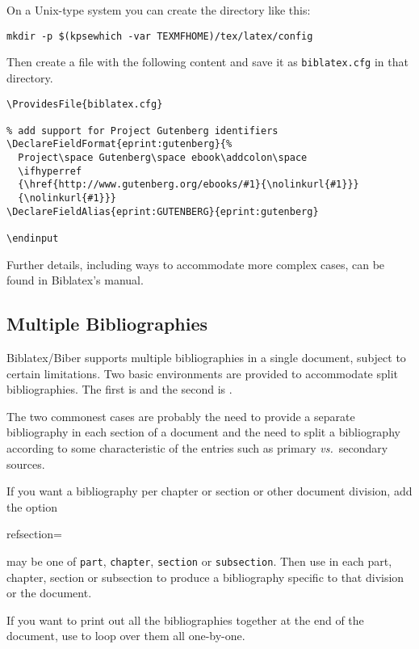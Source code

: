 On a Unix-type system you can create the directory like this:
\begin{verbatim}
mkdir -p $(kpsewhich -var TEXMFHOME)/tex/latex/config
\end{verbatim}
Then create a file with the following content and save it as \texttt{biblatex.cfg} in that directory.
\begin{verbatim}
\ProvidesFile{biblatex.cfg}

% add support for Project Gutenberg identifiers
\DeclareFieldFormat{eprint:gutenberg}{%
  Project\space Gutenberg\space ebook\addcolon\space
  \ifhyperref
  {\href{http://www.gutenberg.org/ebooks/#1}{\nolinkurl{#1}}}
  {\nolinkurl{#1}}}
\DeclareFieldAlias{eprint:GUTENBERG}{eprint:gutenberg}

\endinput
\end{verbatim}
Further details, including ways to accommodate more complex cases, can be found in Biblatex's manual.


\subsection{Multiple Bibliographies}\label{subsec:multibib}

Biblatex/Biber supports multiple bibliographies in a single document, subject to certain limitations.
Two basic environments are provided to accommodate split bibliographies.
The first is  and the second is .

The two commonest cases are probably the need to provide a separate bibliography in each section of a document and the need to split a bibliography according to some characteristic of the entries such as primary \emph{vs.}\ secondary sources.

If you want a bibliography per chapter or section or other document division, add the option
\begin{semiverbatim}
  refsection=
\end{semiverbatim}
 may be one of \texttt{part}, \texttt{chapter}, \texttt{section} or \texttt{subsection}.
Then use  in each part, chapter, section or subsection to produce a bibliography specific to that division or the document.

If you want to print out all the bibliographies together at the end of the document, use  to loop over them all one-by-one.

